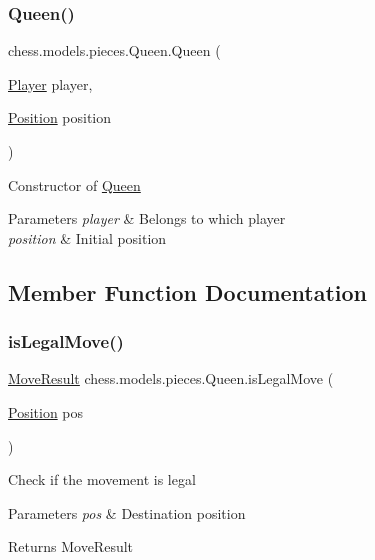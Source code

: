 \subsubsection{\texorpdfstring{Queen()}{Queen()}}
{\footnotesize\ttfamily chess.\+models.\+pieces.\+Queen.\+Queen (\begin{DoxyParamCaption}\item[{\mbox{\hyperlink{enumchess_1_1models_1_1enums_1_1_player}{Player}}}]{player,  }\item[{\mbox{\hyperlink{classchess_1_1models_1_1_position}{Position}}}]{position }\end{DoxyParamCaption})}

Constructor of \mbox{\hyperlink{classchess_1_1models_1_1pieces_1_1_queen}{Queen}}


\begin{DoxyParams}{Parameters}
{\em player} & Belongs to which player \\
\hline
{\em position} & Initial position \\
\hline
\end{DoxyParams}


\subsection{Member Function Documentation}
\mbox{\label{classchess_1_1models_1_1pieces_1_1_queen_a99486b83609e973af4c09ddcf3582617}} 
\subsubsection{\texorpdfstring{is\+Legal\+Move()}{isLegalMove()}}
{\footnotesize\ttfamily \mbox{\hyperlink{enumchess_1_1models_1_1enums_1_1_move_result}{Move\+Result}} chess.\+models.\+pieces.\+Queen.\+is\+Legal\+Move (\begin{DoxyParamCaption}\item[{\mbox{\hyperlink{classchess_1_1models_1_1_position}{Position}}}]{pos }\end{DoxyParamCaption})}

Check if the movement is legal


\begin{DoxyParams}{Parameters}
{\em pos} & Destination position \\
\hline
\end{DoxyParams}
\begin{DoxyReturn}{Returns}
Move\+Result 
\end{DoxyReturn}
\mbox{\label{classchess_1_1models_1_1pieces_1_1_queen_a723a09d8252bb14578d33c099242e37d}} 
